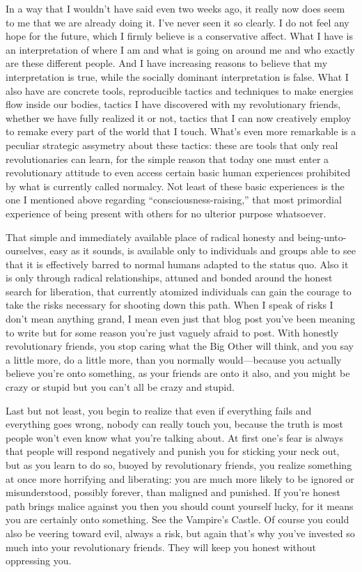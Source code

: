 \documentclass[a4paper,12pt,margin=.5in]{article}
\begin{document}
In a way that I wouldn't have said even two weeks ago, it really now
does seem to me that we are already doing it. I've never seen it so
clearly. I do not feel any hope for the future, which I firmly believe
is a conservative affect. What I have is an interpretation of where I am
and what is going on around me and who exactly are these different
people. And I have increasing reasons to believe that my interpretation
is true, while the socially dominant interpretation is false. What I
also have are concrete tools, reproducible tactics and techniques to
make energies flow inside our bodies, tactics I have discovered with my
revolutionary friends, whether we have fully realized it or not, tactics
that I can now creatively employ to remake every part of the world that
I touch. What's even more remarkable is a peculiar strategic assymetry
about these tactics: these are tools that only real revolutionaries can
learn, for the simple reason that today one must enter a revolutionary
attitude to even access certain basic human experiences prohibited by
what is currently called normalcy. Not least of these basic experiences
is the one I mentioned above regarding ``consciousness-raising,'' that
most primordial experience of being present with others for no ulterior
purpose whatsoever.

That simple and immediately available place of radical honesty and
being-unto-ourselves, easy as it sounds, is available only to
individuals and groups able to see that it is effectively barred to
normal humans adapted to the status quo. Also it is only through radical
relationships, attuned and bonded around the honest search for
liberation, that currently atomized individuals can gain the courage to
take the risks necessary for shooting down this path. When I speak of
risks I don't mean anything grand, I mean even just that blog post
you've been meaning to write but for some reason you're just vaguely
afraid to post. With honestly revolutionary friends, you stop caring
what the Big Other will think, and you say a little more, do a little
more, than you normally would---because you actually believe you're onto
something, as your friends are onto it also, and you might be crazy or
stupid but you can't all be crazy and stupid.

Last but not least, you begin to realize that even if everything fails
and everything goes wrong, nobody can really touch you, because the
truth is most people won't even know what you're talking about. At first
one's fear is always that people will respond negatively and punish you
for sticking your neck out, but as you learn to do so, buoyed by
revolutionary friends, you realize something at once more horrifying and
liberating: you are much more likely to be ignored or misunderstood,
possibly forever, than maligned and punished. If you're honest path
brings malice against you then you should count yourself lucky, for it
means you are certainly onto something. See the Vampire's Castle. Of
course you could also be veering toward evil, always a risk, but again
that's why you've invested so much into your revolutionary friends. They
will keep you honest without oppressing you.
\end{document}
